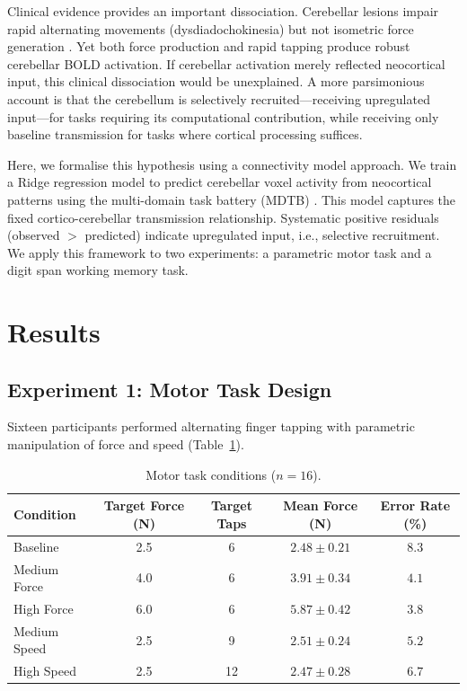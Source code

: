 \documentclass[11pt]{article}
\begin{document}
Clinical evidence provides an important dissociation. Cerebellar lesions impair rapid alternating movements (dysdiadochokinesia) but not isometric force generation \citep{spencer2003disrupted, bastian2006learning}. Yet both force production and rapid tapping produce robust cerebellar BOLD activation. If cerebellar activation merely reflected neocortical input, this clinical dissociation would be unexplained. A more parsimonious account is that the cerebellum is selectively recruited---receiving upregulated input---for tasks requiring its computational contribution, while receiving only baseline transmission for tasks where cortical processing suffices.

Here, we formalise this hypothesis using a connectivity model approach. We train a Ridge regression model \citep{hoerl1970ridge} to predict cerebellar voxel activity from neocortical patterns using the multi-domain task battery (MDTB) \citep{king2019functional}. This model captures the fixed cortico-cerebellar transmission relationship. Systematic positive residuals (observed $>$ predicted) indicate upregulated input, i.e., selective recruitment. We apply this framework to two experiments: a parametric motor task and a digit span working memory task.

\section{Results}

\subsection{Experiment 1: Motor Task Design}

Sixteen participants performed alternating finger tapping with parametric manipulation of force and speed (Table~\ref{tab:motor_design}).

\begin{table}[H]
\centering
\caption{Motor task conditions ($n = 16$).}
\label{tab:motor_design}
\begin{tabular}{@{}lcccc@{}}
\toprule
Condition & Target Force (N) & Target Taps & Mean Force (N) & Error Rate (\%) \\
\midrule
Baseline & 2.5 & 6 & $2.48 \pm 0.21$ & $8.3$ \\
Medium Force & 4.0 & 6 & $3.91 \pm 0.34$ & $4.1$ \\
High Force & 6.0 & 6 & $5.87 \pm 0.42$ & $3.8$ \\
Medium Speed & 2.5 & 9 & $2.51 \pm 0.24$ & $5.2$ \\
High Speed & 2.5 & 12 & $2.47 \pm 0.28$ & $6.7$ \\
\bottomrule
\end{tabular}
\end{table}
\end{document}
